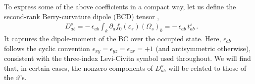 \documentclass[aps,prb,onecolumn,nofootinbib,citeautoscript,10pt]{revtex4-2}
\newcommand{\bs}[1]{\boldsymbol{#1}}
\begin{document}



To express some of the above coefficients in a compact way, let us define the second-rank Berry-curvature dipole (BCD) tensor \cite{bcd-inti},
\begin{align}
\label{eqbcd}
& D^s_{ab} = - \,\epsilon_{ab} \int_k  \partial_a f_0 (\varepsilon_s) \left( \Omega_s \right)_b
= - \,\epsilon_{ab} \, t^s_{ab}\,.
\end{align}
It captures the dipole-moment of the BC over the occupied state. Here, $\epsilon_{ab}$ follows the cyclic convention $\epsilon_{xy}=\epsilon_{yz}=\epsilon_{zx}=+1$ (and antisymmetric otherwise), consistent with the three-index Levi-Civita symbol used throughout. We will find that, in certain cases, the nonzero components of $D^s_{ab}$ will be related to those of the $\vartheta$'s.
\end{document}
